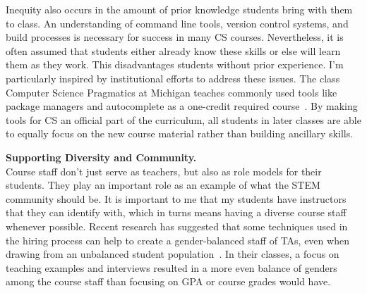 \documentclass[11pt]{article} %
\begin{document}

Inequity also occurs in the amount of prior knowledge students bring with them
to class.
%
An understanding of command line tools, version control systems, and build
processes is necessary for success in many CS courses. Nevertheless, it is
often assumed that students either already know these skills or else will learn
them as they work. This disadvantages students without prior experience.
%
%
I'm particularly inspired by institutional efforts to address these issues. The
class Computer Science Pragmatics at Michigan teaches commonly used tools like
package managers and autocomplete as a one-credit required
course~\footnotemark{}.
%
By making tools for CS an official part of the curriculum, all students in
later classes are able to equally focus on the new course material rather than
building ancillary skills.


\medskip
\textbf{\textsf{\large Supporting Diversity and Community.}}\\
Course staff don't just serve as teachers, but also as role models for their
students. They play an important role as an example of what the STEM community
should be.
%
It is important to me that my students have instructors that they can identify
with, which in turns means having a diverse course staff whenever possible.
%
Recent research has suggested that some techniques used in the hiring process
can help to create a gender-balanced staff of TAs, even when drawing from an
unbalanced student population~\footnotemark{}. In their classes, a focus on
teaching examples and interviews resulted in a more even balance of genders
among the course staff than focusing on GPA or course grades would have.

\end{document}
